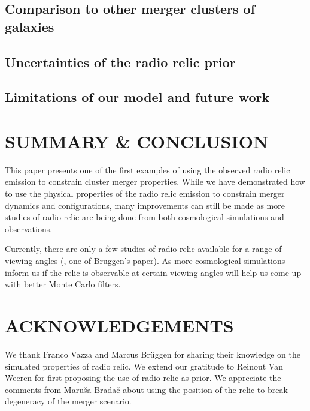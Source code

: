\documentclass[letterpaper,useAMS,usenatbib]{"mn2e"}
\begin{document}
\subsection{Comparison to other merger clusters of galaxies}


\subsection{Uncertainties of the radio relic prior}


\subsection{Limitations of our model and future work} 



\section{SUMMARY \& CONCLUSION}
This paper presents one of the first examples of using the observed radio
relic emission to constrain cluster merger properties.
While we have demonstrated how to use the physical properties of the radio
relic emission to constrain merger dynamics and configurations, many
improvements can still be made as more studies of radio relic are being
done from both cosmological simulations and observations.

Currently, there are only a few studies of
 radio relic available for a range of viewing angles (\citealt{S13}, one of
Bruggen's paper). As more cosmological simulations inform us  
if the relic is observable at certain viewing angles will help us 
come up with better Monte Carlo filters. 

\section{ACKNOWLEDGEMENTS}
We thank Franco Vazza and Marcus Br\"{u}ggen for sharing their knowledge on
the simulated properties of radio relic. We
extend our gratitude to Reinout Van Weeren for first proposing the use of
radio relic as prior. We appreciate the comments from Maru\v{s}a
Brada\v{c} about using the position of the relic to break degeneracy
of the merger scenario. 
\end{document}
